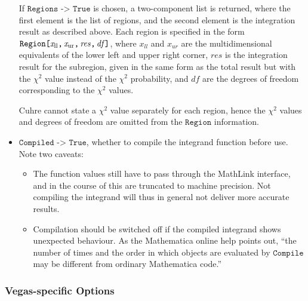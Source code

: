 \documentclass[12pt]{article}
\newcommand\Code[1]{\ensuremath{\texttt{#1}}}
\newcommand\Var[1]{\ensuremath{\mathit{#1}}}
\newcommand\Option[2]{\item\Code{#1 -> #2},}
\begin{document}
\begin{itemize}
If \Code{Regions -> True} is chosen, a two-component list is returned,
where the first element is the list of regions, and the second element
is the integration result as described above.  Each region is specified
in the form \Code{Region[\Var{x_{\mathrm{ll}}},\,\Var{x_{\mathrm{ur}}},%
\,\Var{res},\,\Var{df}]}, where \Var{x_{\text{ll}}} and
\Var{x_{\text{ur}}} are the multidimensional equivalents of the lower
left and upper right corner, \Var{res} is the integration result for the
subregion, given in the same form as the total result but with the
$\chi^2$ value instead of the $\chi^2$ probability, and \Var{df} are the
degrees of freedom corresponding to the $\chi^2$ values. 

Cuhre cannot state a $\chi^2$ value separately for each region, hence
the $\chi^2$ values and degrees of freedom are omitted from the
\Code{Region} information.

\Option{Compiled}{True}
whether to compile the integrand function before use.  Note two caveats:
\begin{itemize}
\item
The function values still have to pass through the MathLink interface,
and in the course of this are truncated to machine precision.  Not
compiling the integrand will thus in general not deliver more accurate
results.
\item
Compilation should be switched off if the compiled integrand shows
unexpected behaviour.  As the Mathematica online help points out, ``the
number of times and the order in which objects are evaluated by
\Code{Compile} may be different from ordinary Mathematica code.''
\end{itemize}
\end{itemize}


\subsubsection{Vegas-specific Options}
\end{document}
